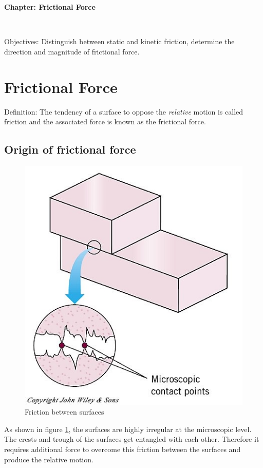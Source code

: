 \documentclass[10pt]{article}
\date{2014-6-22}
\begin{document}
\begin{center}
\begin{Large}\textbf{Chapter: Frictional Force}\end{Large} \\
\smallskip
\end{center}
Objectives: Distinguish between static and kinetic friction, determine the direction and magnitude of frictional force.
\section{Frictional Force}
Definition: The tendency of a surface to oppose the \emph{relative} motion is called friction and the associated force is known as the frictional force. \\

\subsection{Origin of frictional force}
\begin{figure}[h]
\label{frictionsur}
\includegraphics[scale=.8]{frictionsur}
\centering
\caption{Friction between surfaces}
\centering
\end{figure}
As shown in figure \ref{frictionsur}, the surfaces are highly irregular at the microscopic level.  The crests and trough of the surfaces get entangled with each other.  Therefore it requires additional force to overcome this friction between the surfaces and produce the relative motion.  
\end{document}
